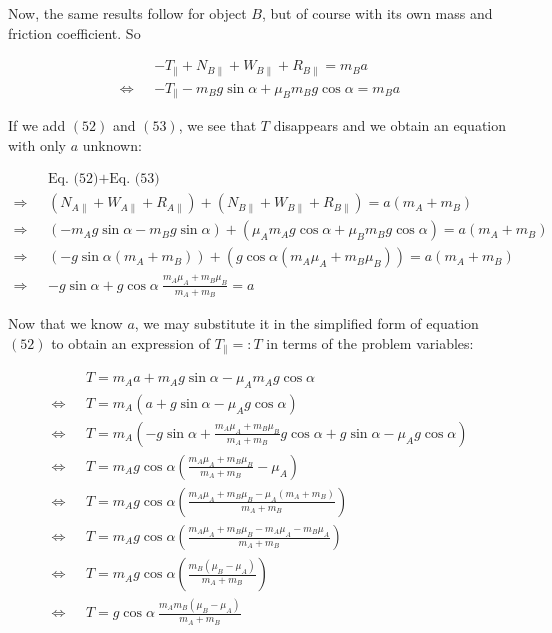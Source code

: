 \documentclass[12pt]{article}
\theoremstyle{definition}
\begin{document}
Now, the same results follow for object $B$, but of course with its own mass and
friction coefficient. So

\begin{align}
    &-T_\parallel + N_{B \parallel} + W_{B \parallel} + R_{B \parallel} = m_B
    a \\ 
    \iff ~ ~ ~ 
    &-T_\parallel - m_B g \sin \alpha + \mu_B m_B g \cos \alpha = m_B a
    \nonumber
\end{align}

If we add $(52)$ and $(53)$, we see that $T$ disappears and we obtain an
equation with only $a$ unknown: 

\begin{align*}
    &\text{Eq. (52)} + \text{Eq. (53)} \\ 
    \Rightarrow~ ~ ~  
    & ( N_{A\parallel} + W_{A \parallel} + R_{A \parallel} ) + (N_{B \parallel} +
    W_{B \parallel} + R_{B \parallel} )= a(m_A + m_B) \\ 
    \Rightarrow~ ~ ~ 
    & \left( 
        -m_A g \sin \alpha - m_B g \sin \alpha
    \right) + 
    \left( 
        \mu_A m_A g \cos \alpha + \mu_B m_B g \cos \alpha
    \right) = a(m_A + m_B) \\ 
    \Rightarrow ~ ~ ~ 
    &\left( -g\sin \alpha (m_A + m_B) \right) + 
    \left( g \cos \alpha (m_A \mu_A + m_B \mu_B) \right) = a(m_A + m_B) \\ 
    \Rightarrow ~ ~ ~ 
    &-g \sin \alpha + g \cos \alpha ~ \frac{m_A \mu_A + m_B \mu_B}{m_A + m_B} = a
\end{align*}

Now that we know $a$, we may substitute it in the simplified form of equation
$(52)$ to obtain an expression of $T_\parallel =: T$ in terms of the problem
variables: 

\begin{align*}
    &T = m_A a + m_A g \sin \alpha - \mu_A m_A g \cos \alpha \\ 
    \iff ~ ~ ~ 
    &T = m_A \left( a + g \sin \alpha - \mu_A g \cos \alpha \right) \\ 
    \iff ~ ~ ~ 
    &T = m_A 
    \left( 
        -g \sin \alpha + \frac{m_A \mu_A + m_B \mu_B}{m_A + m_B}g \cos \alpha
    + g \sin \alpha - \mu_A g \cos \alpha\right) \\ 
    \iff ~ ~ ~ 
    &T = m_A g \cos \alpha
    \left( \frac{m_A \mu_A + m_B \mu_B}{m_A + m_B} - \mu_A \right) \\
    \iff ~ ~ ~ 
    &T = m_A g \cos \alpha
    \left( \frac{m_A \mu_A + m_B \mu_B - \mu_A(m_A + m_B)}{m_A + m_B}
    \right)\\
    \iff ~ ~ ~ 
    &T = m_A g \cos \alpha
    \left( \frac{m_A \mu_A + m_B \mu_B - m_A \mu_A - m_B \mu_A}{m_A + m_B}
    \right)\\ 
    \iff ~ ~ ~ 
    &T = m_A g \cos \alpha
    \left( \frac{m_B(\mu_B - \mu_A)}{m_A + m_B}
    \right)\\ 
    \iff ~ ~ ~ 
    &T =g \cos \alpha  ~ \frac{m_A m_B( \mu_B - \mu_A )}{m_A + m_B}
\end{align*}
\end{document}
